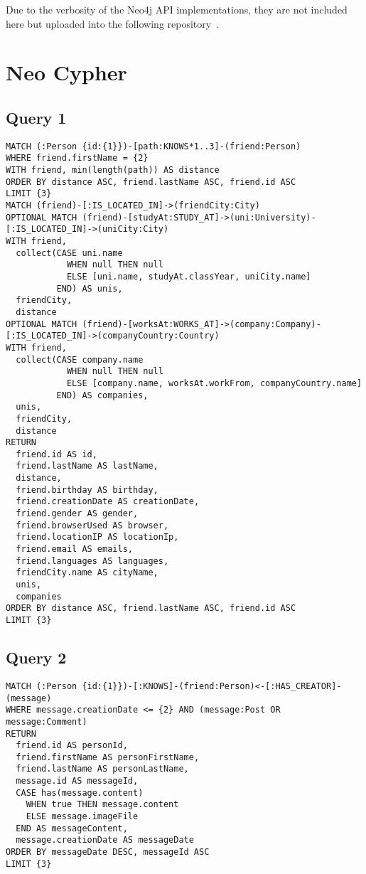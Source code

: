 Due to the verbosity of the Neo4j API implementations, they are not included here but uploaded into the
following repository~\cite{neo-api}.

\section{Neo Cypher}

\subsection{Query 1}
{\footnotesize
\begin{verbatim}
MATCH (:Person {id:{1}})-[path:KNOWS*1..3]-(friend:Person)
WHERE friend.firstName = {2}
WITH friend, min(length(path)) AS distance
ORDER BY distance ASC, friend.lastName ASC, friend.id ASC
LIMIT {3}
MATCH (friend)-[:IS_LOCATED_IN]->(friendCity:City)
OPTIONAL MATCH (friend)-[studyAt:STUDY_AT]->(uni:University)-[:IS_LOCATED_IN]->(uniCity:City)
WITH friend, 
  collect(CASE uni.name 
            WHEN null THEN null 
            ELSE [uni.name, studyAt.classYear, uniCity.name] 
          END) AS unis, 
  friendCity, 
  distance
OPTIONAL MATCH (friend)-[worksAt:WORKS_AT]->(company:Company)-[:IS_LOCATED_IN]->(companyCountry:Country)
WITH friend, 
  collect(CASE company.name 
            WHEN null THEN null 
            ELSE [company.name, worksAt.workFrom, companyCountry.name] 
          END) AS companies, 
  unis, 
  friendCity, 
  distance
RETURN 
  friend.id AS id, 
  friend.lastName AS lastName, 
  distance, 
  friend.birthday AS birthday, 
  friend.creationDate AS creationDate, 
  friend.gender AS gender, 
  friend.browserUsed AS browser, 
  friend.locationIP AS locationIp, 
  friend.email AS emails, 
  friend.languages AS languages, 
  friendCity.name AS cityName, 
  unis, 
  companies
ORDER BY distance ASC, friend.lastName ASC, friend.id ASC
LIMIT {3}
\end{verbatim}
}

\subsection{Query 2}

{\footnotesize
\begin{verbatim}
MATCH (:Person {id:{1}})-[:KNOWS]-(friend:Person)<-[:HAS_CREATOR]-(message)
WHERE message.creationDate <= {2} AND (message:Post OR message:Comment)
RETURN 
  friend.id AS personId, 
  friend.firstName AS personFirstName, 
  friend.lastName AS personLastName, 
  message.id AS messageId, 
  CASE has(message.content) 
    WHEN true THEN message.content 
    ELSE message.imageFile 
  END AS messageContent,
  message.creationDate AS messageDate
ORDER BY messageDate DESC, messageId ASC
LIMIT {3}
\end{verbatim}
}

